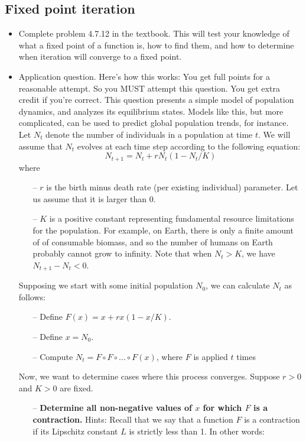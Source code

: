\documentclass{article}
\begin{document}
\subsection{Fixed point iteration}
\begin{itemize}
    \item Complete problem 4.7.12 in the textbook. This will test your knowledge of what a fixed point of a function is, how to find them, and how to determine when iteration will converge to a fixed point.
    \item Application question. Here’s how this works: You get full points for a reasonable attempt. So you MUST attempt this question. You get extra credit if you’re correct. This question presents a simple model of population dynamics, and analyzes its equilibrium states. Models like this, but more complicated, can be used to predict global population trends, for instance. \newline 
    Let $N_t$ denote the number of individuals in a population at time $t$. We will assume that $N_t$ evolves at each time step according to the following equation:
    \[N_{t+1} = N_t + rN_t(1 - N_t/K)\]
    where
    \begin{itemize}
        \item[--] $r$ is the birth minus death rate (per existing individual) parameter. Let us assume that it is larger than 0.
        \item[--] $K$ is a positive constant representing fundamental resource limitations for the population. For example, on Earth, there is only a finite amount of of consumable biomass, and so the number of humans on Earth probably cannot grow to infinity. Note that when $N_t > K$, we have $N_{t+1} − N_t < 0$.
    \end{itemize}
    Supposing we start with some initial population $N_0$, we can calculate $N_t$ as follows:
    \begin{itemize}
        \item[--] Define $F(x) = x + rx(1 − x/K)$.
        \item[--] Define $x = N_0$.
        \item[--] Compute $N_t = F \circ F \circ ... \circ F(x)$, where $F$ is applied $t$ times
    \end{itemize}
    Now, we want to determine cases where this process converges. Suppose $r > 0$ and $K > 0$ are fixed.
    \begin{itemize}
        \item[--] \textbf{Determine all non-negative values of $x$ for which $F$ is a contraction.} Hints: Recall that we say that a function $F$ is a contraction if its Lipschitz constant $L$ is strictly less than 1. In other words:

\end{itemize}
\end{itemize}
\end{document}
